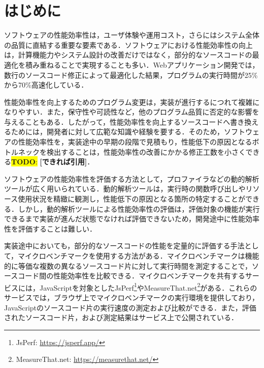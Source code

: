 \documentclass[submit,techrep,noauthor]{ipsj}
\newcommand{\todo}[1]{\colorbox{yellow}{{\bf TODO}:}{\color{red} {\textbf{[#1]}}}}
\begin{document}
\maketitle

\section{はじめに}

 ソフトウェアの性能効率性は，ユーザ体験や運用コスト，さらにはシステム全体の品質に直結する重要な要素である\cite{performance1}\cite{performance2}\cite{negative}．ソフトウェアにおける性能効率性の向上は，計算機能力やシステム設計の改善だけではなく，部分的なソースコードの最適化を積み重ねることで実現することも多い．Webアプリケーション開発では，数行のソースコード修正によって最適化した結果，プログラムの実行時間が25\%から70\%高速化している\cite{jsRefac}．

性能効率性を向上するためのプログラム変更は，実装が進行するにつれて複雑になりやすい\cite{complicate}．また，保守性や可読性など，他のプログラム品質に否定的な影響を与えることもある\cite{negative}．したがって，性能効率性を向上するソースコードへ書き換えるためには，開発者に対して広範な知識や経験を要する．そのため，ソフトウェアの性能効率性を，実装途中の早期の段階で見積もり，性能低下の原因となるボトルネックを検出することは，性能効率性の改善にかかる修正工数を小さくできる\todo{できれば引用}． 

ソフトウェアの性能効率性を評価する方法として，プロファイラなどの動的解析ツールが広く用いられている．動的解析ツールは，実行時の関数呼び出しやリソース使用状況を精緻に観測し，性能低下の原因となる箇所の特定することができる．しかし，動的解析ツールによる性能効率性の評価は，評価対象の機能が実行できるまで実装が進んだ状態でなければ評価できないため，開発途中に性能効率性を評価することは難しい．

実装途中においても，部分的なソースコードの性能を定量的に評価する手法として，マイクロベンチマークを使用する方法がある．マイクロベンチマークは機能的に等価な複数の異なるソースコード片に対して実行時間を測定することで，ソースコード間の性能効率性を比較できる．マイクロベンチマークを共有するサービスには，JavaScriptを対象としたJsPerf\footnote{JsPerf: \url{https://jsperf.app/}}やMeasureThat.net\footnote{MeasureThat.net: \url{https://measurethat.net/}}がある．これらのサービスでは，ブラウザ上でマイクロベンチマークの実行環境を提供しており，JavaScriptのソースコード片の実行速度の測定および比較ができる．また，評価されたソースコード片，および測定結果はサービス上で公開されている．
\end{document}
